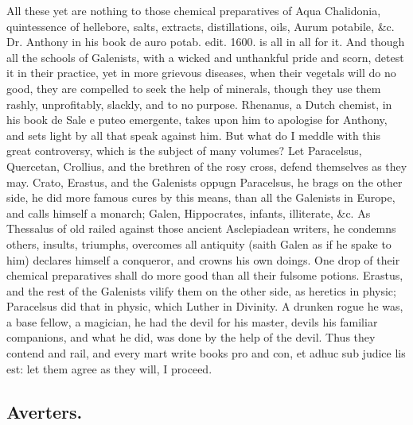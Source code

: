 All these yet are nothing to those chemical preparatives of Aqua
Chalidonia, quintessence of hellebore, salts, extracts, distillations,
oils, Aurum potabile, \&c. Dr. Anthony in his book de auro potab. edit.
1600. is all in all for it. And though all the schools of
Galenists, with a wicked and unthankful pride and scorn, detest it in
their practice, yet in more grievous diseases, when their vegetals will
do no good, they are compelled to seek the help of minerals, though
they use them rashly, unprofitably, slackly, and to no purpose.
Rhenanus, a Dutch chemist, in his book de Sale e puteo emergente, takes
upon him to apologise for Anthony, and sets light by all that speak
against him. But what do I meddle with this great controversy, which is
the subject of many volumes? Let Paracelsus, Quercetan, Crollius, and
the brethren of the rosy cross, defend themselves as they may. Crato,
Erastus, and the Galenists oppugn Paracelsus, he brags on the other
side, he did more famous cures by this means, than all the Galenists in
Europe, and calls himself a monarch; Galen, Hippocrates, infants,
illiterate, \&c. As Thessalus of old railed against those ancient
Asclepiadean writers, he condemns others, insults, triumphs,
overcomes all antiquity (saith Galen as if he spake to him) declares
himself a conqueror, and crowns his own doings. One drop of their
chemical preparatives shall do more good than all their fulsome
potions. Erastus, and the rest of the Galenists vilify them on the
other side, as heretics in physic; Paracelsus did that in physic,
which Luther in Divinity. A drunken rogue he was, a base fellow,
a magician, he had the devil for his master, devils his familiar
companions, and what he did, was done by the help of the devil. Thus
they contend and rail, and every mart write books pro and con, et adhuc
sub judice lis est: let them agree as they will, I proceed.

\subsection{Averters.}

